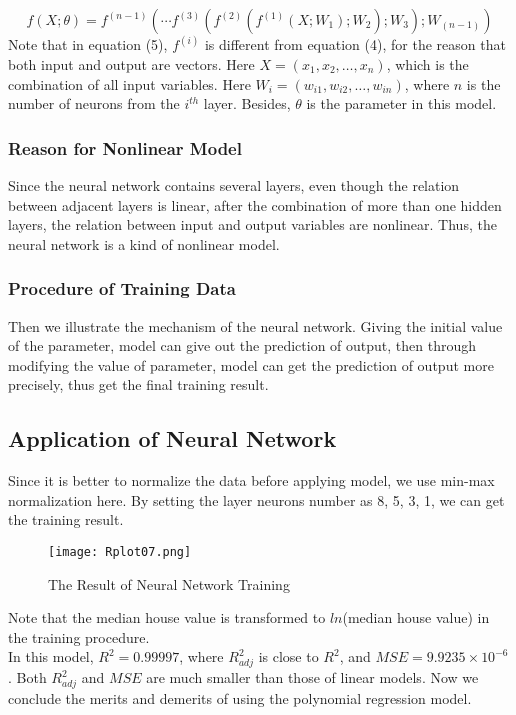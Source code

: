 \documentclass[12pt,a4paper]{article}
\begin{document}
\begin{equation}
f(X;\theta)=f^{(n-1)}\left(\cdots f^{(3)}\left(f^{(2)}\left(f^{(1)}\left(X;W_{1}\right);W_{2}\right);W_{3}\right);W_{(n-1)}\right)
\end{equation}
Note that in equation (5), $f^{(i)}$ is different from equation (4), for the reason that both input and output are vectors. Here $X=(x_{1},x_{2},\dots,x_{n})$, which is the combination of all input variables. Here $W_{i}=(w_{i1},w{_{i2}},\dots,w_{in})$, where $n$ is the number of neurons from the $i^{th}$ layer. Besides, $\theta$ is the parameter in this model.

\subsubsection{Reason for Nonlinear Model}
\qquad Since the neural network contains several layers, even though the relation between adjacent layers is linear, after the combination of more than one hidden layers, the relation between input and output variables are nonlinear. Thus, the neural network is a kind of nonlinear model.
\subsubsection{Procedure of Training Data}
\qquad Then we illustrate the mechanism of the neural network. Giving the initial value of the parameter, model can give out the prediction of output, then through modifying the value of parameter, model can get the prediction of output more precisely, thus get the final training result. 

\subsection{Application of Neural Network}
\qquad Since it is better to normalize the data before applying model, we use min-max normalization here. By setting the layer neurons number as 8, 5, 3, 1, we can get the training result.
\begin{figure}[h]
	\centering
	\texttt{[image: Rplot07.png]}
	\caption{The Result of Neural Network Training}
\end{figure}

Note that the median house value is transformed to $ln$(median house value) in the training procedure. \\
\indent In this model, $R^{2}=0.99997$, where $R^{2}_{adj}$ is close to $R^{2}$, and $MSE=9.9235\times10^{-6}$. Both $R^{2}_{adj}$ and $MSE$ are much smaller than those of linear models. Now we conclude the merits and demerits of using the polynomial regression model. 
\end{document}
